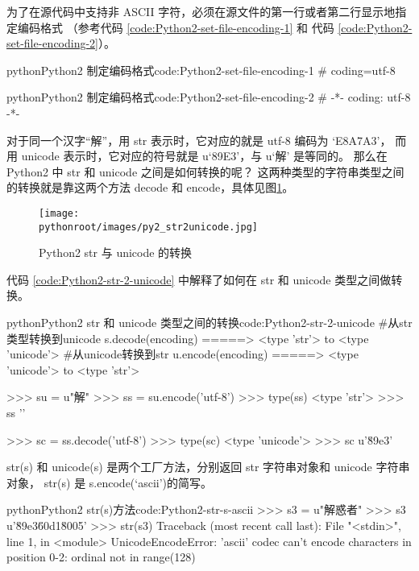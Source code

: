 为了在源代码中支持非 ASCII 字符，必须在源文件的第一行或者第二行显示地指定编码格式
（参考代码 \ref{code:Python2-set-file-encoding-1} 和 代码 \ref{code:Python2-set-file-encoding-2}）。

\begin{jcode}{python}{Python2 制定编码格式}{code:Python2-set-file-encoding-1}
# coding=utf-8
\end{jcode}

\begin{jcode}{python}{Python2 制定编码格式}{code:Python2-set-file-encoding-2}
# -*- coding: utf-8 -*-
\end{jcode}

对于同一个汉字“解”，用 str 表示时，它对应的就是 utf-8 编码为 `E8A7A3'，
而用 unicode 表示时，它对应的符号就是 u`89E3'，与 u`解' 是等同的。
那么在 Python2 中 str 和 unicode 之间是如何转换的呢？
这两种类型的字符串类型之间的转换就是靠这两个方法 decode 和 encode，具体见图\ref{fig:Python2-str-2-unicode}。

\begin{figure}[ht]
  \centering
  \texttt{[image: \\pythonroot/images/py2\_str2unicode.jpg]}
  \caption{Python2 str 与 unicode 的转换}
  \label{fig:Python2-str-2-unicode}
\end{figure}

代码 \ref{code:Python2-str-2-unicode} 中解释了如何在 str 和 unicode 类型之间做转换。

\begin{jcode}{python}{Python2 str 和 unicode 类型之间的转换}{code:Python2-str-2-unicode}
#从str类型转换到unicode
s.decode(encoding)   =====>  <type 'str'> to <type 'unicode'>
#从unicode转换到str
u.encode(encoding)   =====>  <type 'unicode'> to <type 'str'>

>>> su = u"解" 
>>> ss = su.encode('utf-8')
>>> type(ss)
<type 'str'>
>>> ss
''

>>> sc = ss.decode('utf-8')
>>> type(sc)
<type 'unicode'>
>>> sc
u'\u89e3'
\end{jcode}

str(s) 和 unicode(s) 是两个工厂方法，分别返回 str 字符串对象和 unicode 字符串对象，
str(s) 是 s.encode(`ascii')的简写。

\begin{jcode}{python}{Python2 str(s)方法}{code:Python2-str-s-ascii}
>>> s3 = u"解惑者"
>>> s3
u'\u89e3\u60d1\u8005'
>>> str(s3)
Traceback (most recent call last):
  File "<stdin>", line 1, in <module>
UnicodeEncodeError: 'ascii' codec can't encode characters in position 0-2:
ordinal not in range(128)
\end{jcode}

